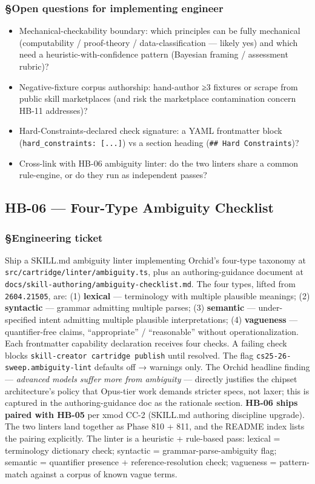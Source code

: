 \documentclass[11pt,letterpaper]{article}
\newcommand{\arxivid}[1]{\texttt{\textcolor{accent}{#1}}}
\providecommand{\tightlist}{\setlength{\itemsep}{0pt}\setlength{\parskip}{0pt}}
\begin{document}
\subsubsection{§Open questions for implementing
engineer}

\begin{itemize}
\tightlist
\item
  Mechanical-checkability boundary: which principles can be fully
  mechanical (computability / proof-theory / data-classification ---
  likely yes) and which need a heuristic-with-confidence pattern
  (Bayesian framing / assessment rubric)?
\item
  Negative-fixture corpus authorship: hand-author ≥3 fixtures or scrape
  from public skill marketplaces (and risk the marketplace contamination
  concern HB-11 addresses)?
\item
  Hard-Constraints-declared check signature: a YAML frontmatter block
  (\texttt{hard\_constraints:\ {[}...{]}}) vs a section heading
  (\texttt{\#\#\ Hard\ Constraints})?
\item
  Cross-link with HB-06 ambiguity linter: do the two linters share a
  common rule-engine, or do they run as independent passes?
\end{itemize}


\subsection{HB-06 — Four-Type Ambiguity Checklist}
\subsubsection{§Engineering ticket}

Ship a SKILL.md ambiguity linter implementing Orchid's four-type
taxonomy at \texttt{src/cartridge/linter/ambiguity.ts}, plus an
authoring-guidance document at
\texttt{docs/skill-authoring/ambiguity-checklist.md}. The four types,
lifted from \arxivid{2604.21505}, are: (1) \textbf{lexical} ---
terminology with multiple plausible meanings; (2) \textbf{syntactic} ---
grammar admitting multiple parses; (3) \textbf{semantic} ---
under-specified intent admitting multiple plausible interpretations; (4)
\textbf{vagueness} --- quantifier-free claims, ``appropriate'' /
``reasonable'' without operationalization. Each frontmatter capability
declaration receives four checks. A failing check blocks
\texttt{skill-creator\ cartridge\ publish} until resolved. The flag
\texttt{cs25-26-sweep.ambiguity-lint} defaults off → warnings only. The
Orchid headline finding --- \emph{advanced models suffer more from
ambiguity} --- directly justifies the chipset architecture's policy that
Opus-tier work demands stricter specs, not laxer; this is captured in
the authoring-guidance doc as the rationale section. \textbf{HB-06 ships
paired with HB-05} per xmod CC-2 (SKILL.md authoring discipline
upgrade). The two linters land together as Phase 810 + 811, and the
README index lists the pairing explicitly. The linter is a heuristic +
rule-based pass: lexical = terminology dictionary check; syntactic =
grammar-parse-ambiguity flag; semantic = quantifier presence +
reference-resolution check; vagueness = pattern-match against a corpus
of known vague terms.
\end{document}
